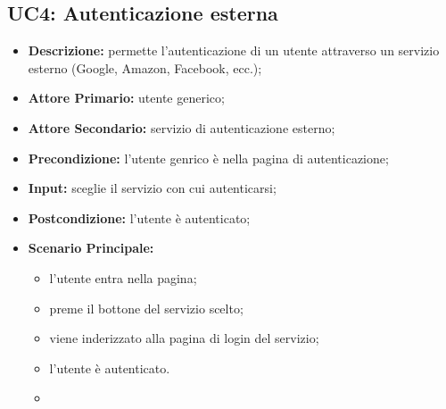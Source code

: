 \subsection{UC4: Autenticazione esterna}
        \label{sec:UC4}
        \begin{itemize}
            \item \textbf{Descrizione:} permette l'autenticazione di un utente attraverso un servizio esterno (Google, Amazon, Facebook, ecc.);
            \item \textbf{Attore Primario:} utente generico;
            \item \textbf{Attore Secondario:} servizio di autenticazione esterno;
            \item \textbf{Precondizione:} l'utente genrico è nella pagina di autenticazione;
            \item \textbf{Input:} sceglie il servizio con cui autenticarsi;
            \item \textbf{Postcondizione:} l'utente è autenticato;
            \item \textbf{Scenario Principale:} 
            \begin{itemize}
                \item l'utente entra nella pagina;
                \item preme il bottone del servizio scelto;
                \item viene inderizzato alla pagina di login del servizio;
                \item l'utente è autenticato.
                \item 
            \end{itemize}
        \end{itemize}